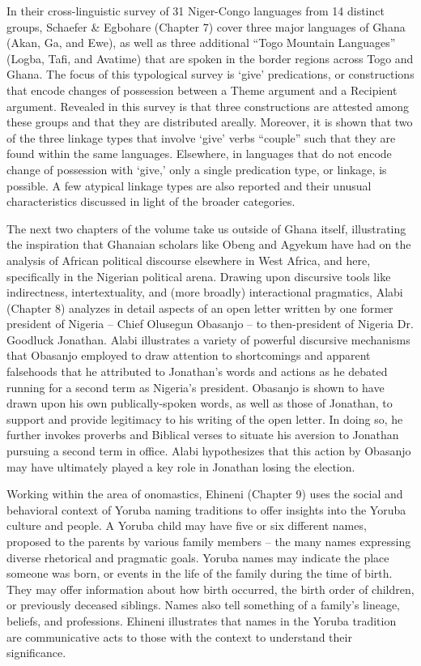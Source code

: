 \documentclass[output=paper,colorlinks,citecolor=brown]{langscibook}
\begin{document}
In their cross-linguistic survey of 31 Niger-Congo languages from 14 distinct groups, Schaefer \& Egbohare (Chapter 7) cover three major languages of Ghana (Akan, Ga, and Ewe), as well as three additional ``Togo Mountain Languages'' (Logba, Tafi, and Avatime) that are spoken in the border regions across Togo and Ghana. The focus of this typological survey is `give' predications, or constructions that encode changes of possession between a Theme argument and a Recipient argument. Revealed in this survey is that three constructions are attested among these groups and that they are distributed areally. Moreover, it is shown that two of the three linkage types that involve `give' verbs ``couple'' such that they are found within the same languages. Elsewhere, in languages that do not encode change of possession with `give,' only a single predication type, or linkage, is possible. A few atypical linkage types are also reported and their unusual characteristics discussed in light of the broader categories.

The next two chapters of the volume take us outside of Ghana itself, illustrating the inspiration that Ghanaian scholars like Obeng and Agyekum have had on the analysis of African political discourse elsewhere in West Africa, and here, specifically in the Nigerian political arena. Drawing upon discursive tools like indirectness, intertextuality, and (more broadly) interactional pragmatics, Alabi (Chapter 8) analyzes in detail aspects of an open letter written by one former president of Nigeria -- Chief Olusegun Obasanjo -- to then-president of Nigeria Dr. Goodluck Jonathan. Alabi illustrates a variety of powerful discursive mechanisms that Obasanjo employed to draw attention to shortcomings and apparent falsehoods that he attributed to Jonathan's words and actions as he debated running for a second term as Nigeria's president. Obasanjo is shown to have drawn upon his own publically-spoken words, as well as those of Jonathan, to support and provide legitimacy to his writing of the open letter. In doing so, he further invokes proverbs and Biblical verses to situate his aversion to Jonathan pursuing a second term in office. Alabi hypothesizes that this action by Obasanjo may have ultimately played a key role in Jonathan losing the election.

Working within the area of onomastics, Ehineni (Chapter 9) uses the social and behavioral context of Yoruba naming traditions to offer insights into the Yoruba culture and people. A Yoruba child may have five or six different names, proposed to the parents by various family members -- the many names expressing diverse rhetorical and pragmatic goals. Yoruba names may indicate the place someone was born, or events in the life of the family during the time of birth. They may offer information about how birth occurred, the birth order of children, or previously deceased siblings. Names also tell something of a family's lineage, beliefs, and professions. Ehineni illustrates that names in the Yoruba tradition are communicative acts to those with the context to understand their significance.
\end{document}
